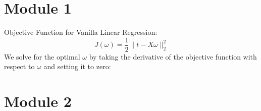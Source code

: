 \documentclass[10pt]{article}
\begin{document}
\begin{multicols}{2}

\section*{Module 1}
Objective Function for Vanilla Linear Regression:
\begin{equation}
    J(\omega) = \frac{1}{2} \lVert{t - X\omega} \rVert^{2}_{2}
\end{equation}
We solve for the optimal $\omega$ by taking the derivative of the objective function with respect to $\omega$ and setting it to zero:

\section*{Module 2}


\end{multicols}
\end{document}
